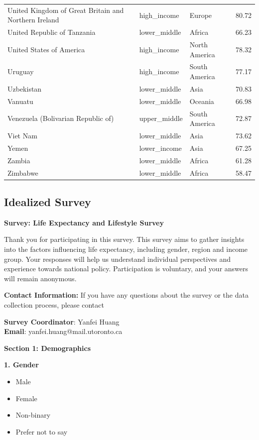 \documentclass[
  letterpaper,
  DIV=11,
  numbers=noendperiod]{scrartcl}
\providecommand{\tightlist}{%
  \setlength{\itemsep}{0pt}\setlength{\parskip}{0pt}}\usepackage{longtable,booktabs,array}
\begin{document}
\begin{longtable}[t]{llll}
United Kingdom of Great Britain and Northern Ireland & high\_income & Europe & 80.72\\
United Republic of Tanzania & lower\_middle & Africa & 66.23\\
\addlinespace
United States of America & high\_income & North America & 78.32\\
Uruguay & high\_income & South America & 77.17\\
Uzbekistan & lower\_middle & Asia & 70.83\\
Vanuatu & lower\_middle & Oceania & 66.98\\
Venezuela (Bolivarian Republic of) & upper\_middle & South America & 72.87\\
\addlinespace
Viet Nam & lower\_middle & Asia & 73.62\\
Yemen & lower\_income & Asia & 67.25\\
Zambia & lower\_middle & Africa & 61.28\\
Zimbabwe & lower\_middle & Africa & 58.47\\
\bottomrule

\end{longtable}

\endgroup{}

\subsection{Idealized Survey}\label{idealized-survey}

\textbf{Survey: Life Expectancy and Lifestyle Survey}

Thank you for participating in this survey. This survey aims to gather
insights into the factors influencing life expectancy, including gender,
region and income group. Your responses will help us understand
individual perspectives and experience towards national policy.
Participation is voluntary, and your answers will remain anonymous.

\textbf{Contact Information:} If you have any questions about the survey
or the data collection process, please contact

\textbf{Survey Coordinator}: Yanfei Huang\\
\textbf{Email}: yanfei.huang@mail.utoronto.ca

\textbf{Section 1: Demographics}

\textbf{1. Gender}

\begin{itemize}
\tightlist
\item
  Male
\item
  Female
\item
  Non-binary
\item
  Prefer not to say
\end{itemize}
\end{document}
